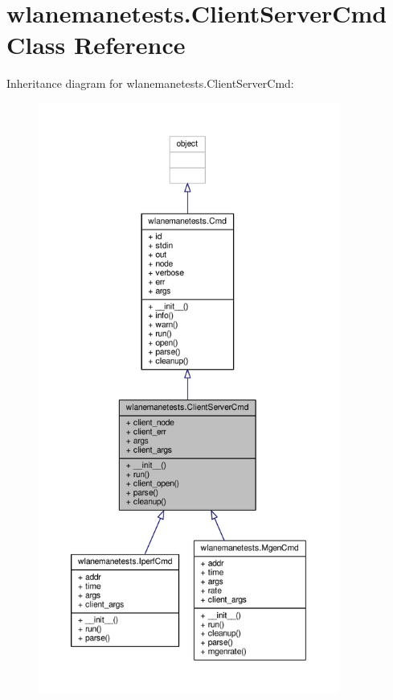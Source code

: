 \hypertarget{classwlanemanetests_1_1_client_server_cmd}{\section{wlanemanetests.\+Client\+Server\+Cmd Class Reference}
\label{classwlanemanetests_1_1_client_server_cmd}
}


Inheritance diagram for wlanemanetests.\+Client\+Server\+Cmd\+:
\nopagebreak
\begin{figure}[H]
\begin{center}
\leavevmode
\includegraphics[height=550pt]{classwlanemanetests_1_1_client_server_cmd__inherit__graph}
\end{center}
\end{figure}


